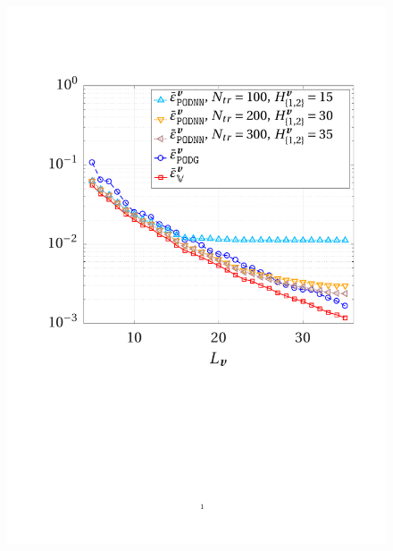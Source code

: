 \documentclass[longtitle]{elsarticle}
\numberwithin{equation}{section}
\theoremstyle{theorem}
\theoremstyle{definition}
\theoremstyle{remark}
\theoremstyle{proposition}
\numberwithin{figure}{section}
\begin{document}
		\begin{figure}[t!]
			\center
			\includegraphics[scale = 0.37, trim = {2cm 9cm 1.5cm 3.5cm}, clip]{dc_200_vel_error_vs_rank}
			\hspace*{1cm}

\end{figure}
\end{document}
